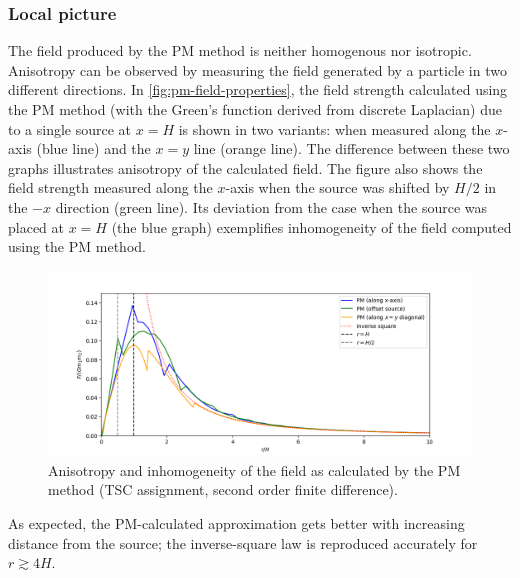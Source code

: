 \subsubsection{Local picture}
The field produced by the PM method is neither homogenous nor isotropic.
Anisotropy can be observed by measuring the field generated by a particle in two different directions.
In \autoref{fig:pm-field-properties}, the field strength calculated using the PM method (with the Green's function derived from discrete Laplacian) due to a single source at $x = H$ is shown in two variants: when measured along the $x$-axis (blue line) and the $x=y$ line (orange line).
The difference between these two graphs illustrates anisotropy of the calculated field.
The figure also shows the field strength measured along the $x$-axis when the source was shifted by $H/2$ in the $-x$ direction (green line).
Its deviation from the case when the source was placed at $x=H$ (the blue graph) exemplifies inhomogeneity of the field computed using the PM method.
\begin{figure}[htp]
    \centering
    \includegraphics[scale=0.55]{img/pm/pm-field-combined.png}
    \caption{Anisotropy and inhomogeneity of the field as calculated by the PM method (TSC assignment, second order finite difference).}
    \label{fig:pm-field-properties}
\end{figure}
As expected, the PM-calculated approximation gets better with increasing distance from the source;
the inverse-square law is reproduced accurately for $r \gtrsim 4H$.

